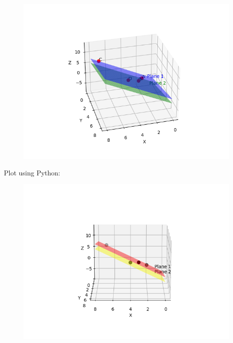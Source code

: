 \documentclass{beamer}
\numberwithin{equation}{section}
\begin{document}
\begin{figure}[H]
	\centering
	\includegraphics[scale=0.5]{img1}
	\caption*{}
	\label{img1}
\end{figure}
Plot using Python:
\begin{figure}[H]
	\centering
	\includegraphics[scale=0.5]{img2}
	\caption*{}
	\label{img2}
\end{figure}
\end{document}
